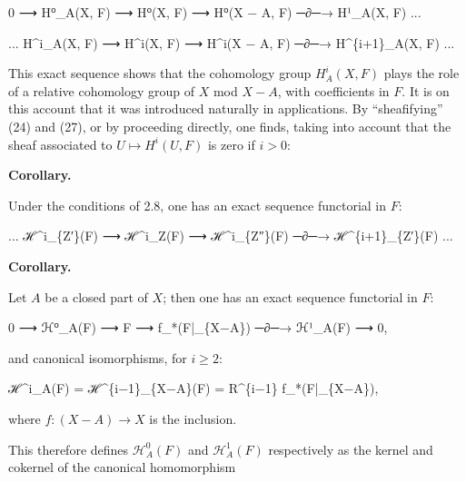\documentclass[
  11pt,
  a4paper,
]{book}
\newenvironment{Shaded}{}{}
\newcommand{\NormalTok}[1]{#1}
\begin{document}
\begin{Shaded}
\begin{Highlighting}[]
\NormalTok{0 ⟶ H⁰\_A(X, F) ⟶ H⁰(X, F) ⟶ H⁰(X − A, F) ─∂─→ H¹\_A(X, F) ...}

\NormalTok{... H\^{}i\_A(X, F) ⟶ H\^{}i(X, F) ⟶ H\^{}i(X − A, F) ─∂─→ H\^{}\{i+1\}\_A(X, F) ...}
\end{Highlighting}
\end{Shaded}

This exact sequence shows that the cohomology group \(H^{i}_{A}(X, F)\)
plays the role of a relative cohomology group of \(X\) mod \(X - A\),
with coefficients in \(F\). It is on this account that it was introduced
naturally in applications. By ``sheafifying'' (24) and (27), or by
proceeding directly, one finds, taking into account that the sheaf
associated to \(U
\mapsto H^{i}(U, F)\) is zero if \(i > 0\):

\textbf{Corollary.}

Under the conditions of 2.8, one has an exact sequence functorial in
\(F\):

\begin{Shaded}
\begin{Highlighting}[]
\NormalTok{... ℋ\^{}i\_\{Z′\}(F) ⟶ ℋ\^{}i\_Z(F) ⟶ ℋ\^{}i\_\{Z″\}(F) ─∂─→ ℋ\^{}\{i+1\}\_\{Z′\}(F) ...}
\end{Highlighting}
\end{Shaded}

\textbf{Corollary.}

Let \(A\) be a closed part of \(X\); then one has an exact sequence
functorial in \(F\):

\begin{Shaded}
\begin{Highlighting}[]
\NormalTok{0 ⟶ ℋ⁰\_A(F) ⟶ F ⟶ f\_*(F|\_\{X−A\}) ─∂─→ ℋ¹\_A(F) ⟶ 0,}
\end{Highlighting}
\end{Shaded}

and canonical isomorphisms, for \(i \geqslant 2\):

\begin{Shaded}
\begin{Highlighting}[]
\NormalTok{ℋ\^{}i\_A(F) = ℋ\^{}\{i−1\}\_\{X−A\}(F) = R\^{}\{i−1\} f\_*(F|\_\{X−A\}),}
\end{Highlighting}
\end{Shaded}

where \(f: (X - A) \to X\) is the inclusion.

This therefore defines \(\mathcal{H}^{0}_{A}(F)\) and
\(\mathcal{H}^{1}_{A}(F)\) respectively as the kernel and cokernel of
the canonical homomorphism
\end{document}
